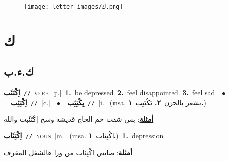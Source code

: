 \documentclass[10pt,a4paper,twoside]{article} %
\begin{document}
\begin{figure*}[t!]\centering\texttt{[image: letter\_images/ك.png]}\end{figure*}
\color{white}

 \section*{\foreignlanguage{arabic}{ك}} 
 \begin{multicols}{2} 

%
\color{black}
\vspace{-3mm}
\subsection*{\color{blue}\foreignlanguage{arabic}{ك.ء.ب}\color{blue}{}} 

{\setlength\topsep{0pt}\textbf{\foreignlanguage{arabic}{اِكْتَئَب}}\ {\color{gray}\texttt{//}\color{black}}\ \textsc{verb}\ [p.]\ \textbf{1.}~be depressed.  \textbf{2.}~feel disappointed.  \textbf{3.}~feel sad\ \ $\bullet$\ \ \setlength\topsep{0pt}\textbf{\foreignlanguage{arabic}{اِكْتِئِب}}\ {\color{gray}\texttt{//}\color{black}}\ [c.]\ \ $\bullet$\ \ \setlength\topsep{0pt}\textbf{\foreignlanguage{arabic}{يِكْتِئِب}}\ {\color{gray}\texttt{//}\color{black}}\ [i.]\ \color{gray}(msa. \foreignlanguage{arabic}{يشعر بالحزن}~\foreignlanguage{arabic}{\textbf{٢.}}  \foreignlanguage{arabic}{يَكْتَئِب}~\foreignlanguage{arabic}{\textbf{١.}})\color{black}\  \begin{flushright}\color{gray}\foreignlanguage{arabic}{\textbf{\underline{\foreignlanguage{arabic}{أمثلة}}}: بس شفت خم الجاج قديشه وسخ اِكْتَئَبت والله}\end{flushright}\color{black}} \vspace{2mm}

{\setlength\topsep{0pt}\textbf{\foreignlanguage{arabic}{اِكْتِئَاب}}\ {\color{gray}\texttt{//}\color{black}}\ \textsc{noun}\ [m.]\ \color{gray}(msa. \foreignlanguage{arabic}{اكْتِئاب}~\foreignlanguage{arabic}{\textbf{١.}})\color{black}\ \textbf{1.}~depression\  \begin{flushright}\color{gray}\foreignlanguage{arabic}{\textbf{\underline{\foreignlanguage{arabic}{أمثلة}}}: صابني اكْتِئاب من ورا هالشغل المقرف}\end{flushright}\color{black}} \vspace{2mm}


\end{multicols}
\end{document}
